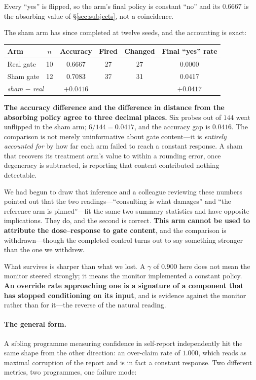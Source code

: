 \documentclass[11pt]{article}
\begin{document}
\noindent
Every ``yes'' is flipped, so the arm's final policy is constant ``no'' and its
$0.6667$ is the absorbing value of \S\ref{sec:subjects}, not a coincidence.

The sham arm has since completed at twelve seeds, and the accounting is exact:

\begin{center}
\begin{tabular}{lccccc}
\toprule
Arm & $n$ & Accuracy & Fired & Changed & Final ``yes'' rate \\
\midrule
Real gate & 10 & 0.6667 & 27 & 27 & 0.0000 \\
Sham gate & 12 & 0.7083 & 37 & 31 & 0.0417 \\
\midrule
\multicolumn{2}{l}{\emph{sham} $-$ \emph{real}} & $+0.0416$ & & & $+0.0417$ \\
\bottomrule
\end{tabular}
\end{center}

\noindent
\textbf{The accuracy difference and the difference in distance from the
absorbing policy agree to three decimal places.} Six probes out of $144$ went
unflipped in the sham arm; $6/144 = 0.0417$, and the accuracy gap is $0.0416$.
The comparison is not merely uninformative about gate content---it is
\emph{entirely accounted for} by how far each arm failed to reach a constant
response. A sham that recovers its treatment arm's value to within a rounding
error, once degeneracy is subtracted, is reporting that content contributed
nothing detectable.

We had begun to draw that inference and a colleague reviewing these numbers
pointed out that the two readings---``consulting is what damages'' and ``the
reference arm is pinned''---fit the same two summary statistics and have
opposite implications. They do, and the second is correct. \textbf{This arm
cannot be used to attribute the dose--response to gate content}, and the
comparison is withdrawn---though the completed control turns out to say
something stronger than the one we withdrew.

What survives is sharper than what we lost. A $\gamma$ of $0.900$ here does not
mean the monitor steered strongly; it means the monitor implemented a constant
policy. \textbf{An override rate approaching one is a signature of a component
that has stopped conditioning on its input}, and is evidence against the
monitor rather than for it---the reverse of the natural reading.

\paragraph{The general form.} A sibling programme measuring confidence in
self-report independently hit the same shape from the other direction: an
over-claim rate of $1.000$, which reads as maximal corruption of the report and
is in fact a constant response. Two different metrics, two programmes, one
failure mode:
\end{document}
